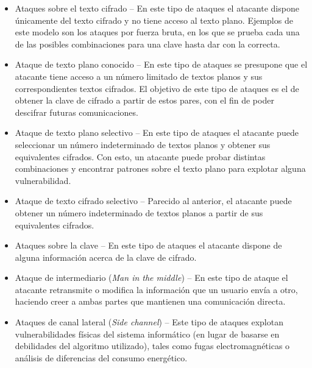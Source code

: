 \begin{itemize}
  \item Ataques sobre el texto cifrado -- En este tipo de ataques el atacante dispone únicamente del texto cifrado y no tiene acceso al texto plano. Ejemplos de este modelo son los ataques por fuerza bruta, en los que se prueba cada una de las posibles combinaciones para una clave hasta dar con la correcta.

  \item Ataque de texto plano conocido -- En este tipo de ataques se presupone que el atacante tiene acceso a un número limitado de textos planos y sus correspondientes textos cifrados. El objetivo de este tipo de ataques es el de obtener la clave de cifrado a partir de estos pares, con el fin de poder descifrar futuras comunicaciones.

  \item Ataque de texto plano selectivo -- En este tipo de ataques el atacante puede seleccionar un número indeterminado de textos planos y obtener sus equivalentes cifrados. Con esto, un atacante puede probar distintas combinaciones y encontrar patrones sobre el texto plano para explotar alguna vulnerabilidad.

  \item Ataque de texto cifrado selectivo -- Parecido al anterior, el atacante puede obtener un número indeterminado de textos planos a partir de sus equivalentes cifrados.

  \item Ataques sobre la clave -- En este tipo de ataques el atacante dispone de alguna información acerca de la clave de cifrado.

  \item Ataque de intermediario (\emph{Man in the middle}) -- En este tipo de ataque el atacante retransmite o modifica la información que un usuario envía a otro, haciendo creer a ambas partes que mantienen una comunicación directa.

  \item Ataques de canal lateral (\emph{Side channel}) -- Este tipo de ataques explotan vulnerabilidades físicas del sistema informático (en lugar de basarse en debilidades del algoritmo utilizado), tales como fugas electromagnéticas o análisis de diferencias del consumo energético.
\end{itemize} \emph{\parencite{Reference20}}\\
